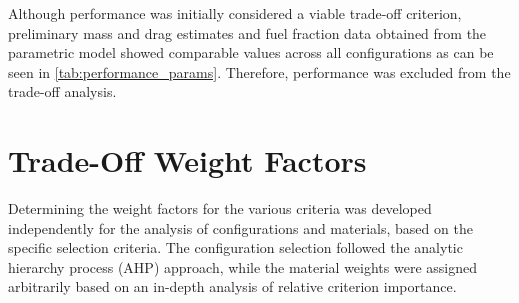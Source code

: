 Although performance was initially considered a viable trade-off criterion, preliminary mass and drag estimates and fuel fraction data obtained from the parametric model showed comparable values across all configurations as can be seen in \autoref{tab:performance_params}. Therefore, performance was excluded from the trade-off analysis.

\begin{table}[H]
\centering
\caption{Performance parameters for configurations}
\label{tab:performance_params}

\end{table}

\section{Trade-Off Weight Factors}
\label{sec:trade-off_weight_factors}
Determining the weight factors for the various criteria was developed independently for the analysis of configurations and materials, based on the specific selection criteria. The configuration selection followed the analytic hierarchy process (AHP) approach, while the material weights were assigned arbitrarily based on an in-depth analysis of relative criterion importance.


